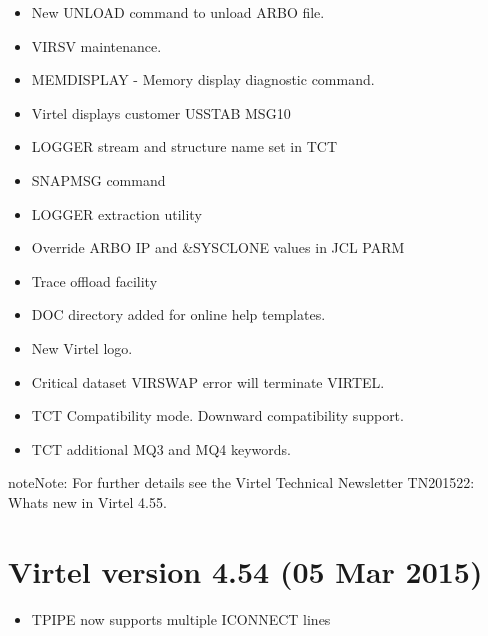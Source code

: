 \documentclass[letterpaper,10pt,english]{sphinxmanual}
\begin{document}
\begin{itemize}
\item {} 
New UNLOAD command to unload ARBO file.

\item {} 
VIRSV maintenance.

\item {} 
MEMDISPLAY - Memory display diagnostic command.

\item {} 
Virtel displays customer USSTAB MSG10

\item {} 
LOGGER stream and structure name set in TCT

\item {} 
SNAPMSG command

\item {} 
LOGGER extraction utility

\item {} 
Override ARBO IP and \&SYSCLONE values in JCL PARM

\item {} 
Trace offload facility

\item {} 
DOC directory added for online help templates.

\item {} 
New Virtel logo.

\item {} 
Critical dataset VIRSWAP error will terminate VIRTEL.

\item {} 
TCT Compatibility mode. Downward compatibility support.

\end{itemize}

\begin{itemize}
\item {} 
TCT additional MQ3 and MQ4 keywords.

\end{itemize}

\begin{sphinxadmonition}{note}{Note:}
For further details see the Virtel Technical Newsletter TN201522: Whats new in Virtel 4.55.
\end{sphinxadmonition}


\section{Virtel version 4.54 (05 Mar 2015)}
\label{\detokenize{Installation_Guide:virtel-version-4-54-05-mar-2015}}
\begin{itemize}
\item {} 
TPIPE now supports multiple ICONNECT lines

\end{itemize}
\end{document}
